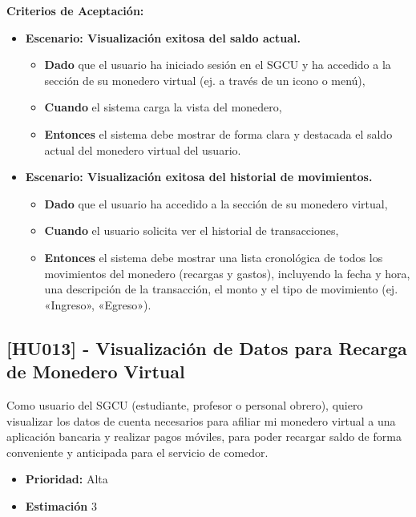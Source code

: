 \documentclass[12pt]{article}
\begin{document}
\textbf{Criterios de Aceptación:}
\begin{itemize}
	\item \textbf{Escenario: Visualización exitosa del saldo actual.}
	\begin{itemize}
		\item \textbf{Dado} que el usuario ha iniciado sesión en el SGCU y ha accedido a la sección de su monedero virtual (ej. a través de un icono o menú),
		\item \textbf{Cuando} el sistema carga la vista del monedero,
		\item \textbf{Entonces} el sistema debe mostrar de forma clara y destacada el saldo actual del monedero virtual del usuario.
	\end{itemize}

	\item \textbf{Escenario: Visualización exitosa del historial de movimientos.}
	\begin{itemize}
		\item \textbf{Dado} que el usuario ha accedido a la sección de su monedero virtual,
		\item \textbf{Cuando} el usuario solicita ver el historial de transacciones,
		\item \textbf{Entonces} el sistema debe mostrar una lista cronológica de todos los movimientos del monedero (recargas y gastos), incluyendo la fecha y hora, una descripción de la transacción, el monto y el tipo de movimiento (ej. «Ingreso», «Egreso»).
	\end{itemize}
\end{itemize}

\pagebreak

\subsection{[HU013] - Visualización de Datos para Recarga de Monedero Virtual}

Como usuario del SGCU (estudiante, profesor o personal obrero), quiero visualizar los datos de cuenta necesarios para afiliar mi monedero virtual a una aplicación bancaria y realizar pagos móviles, para poder recargar saldo de forma conveniente y anticipada para el servicio de comedor.

\begin{itemize}
	\item \textbf{Prioridad:} Alta
	\item \textbf{Estimación} 3
\end{itemize}
\end{document}
